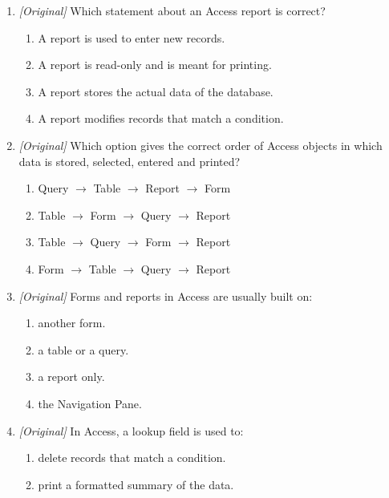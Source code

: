 \documentclass[11pt]{article}
\begin{document}
\begin{enumerate}[label=\textbf{Q\arabic*.}, leftmargin=*]
  formatted, printable layout?
  \begin{enumerate}[label=\Alph*.]
    \item Form
    \item Report
    \item Query
    \item Table
  \end{enumerate}
\item \textit{[Original]} Which statement about an Access report is correct?
  \begin{enumerate}[label=\Alph*.]
    \item A report is used to enter new records.
    \item A report is read-only and is meant for printing.
    \item A report stores the actual data of the database.
    \item A report modifies records that match a condition.
  \end{enumerate}
\item \textit{[Original]} Which option gives the correct order of Access
  objects in which data is stored, selected, entered and printed?
  \begin{enumerate}[label=\Alph*.]
    \item Query $\rightarrow$ Table $\rightarrow$ Report $\rightarrow$ Form
    \item Table $\rightarrow$ Form $\rightarrow$ Query $\rightarrow$ Report
    \item Table $\rightarrow$ Query $\rightarrow$ Form $\rightarrow$ Report
    \item Form $\rightarrow$ Table $\rightarrow$ Query $\rightarrow$ Report
  \end{enumerate}
\item \textit{[Original]} Forms and reports in Access are usually built on:
  \begin{enumerate}[label=\Alph*.]
    \item another form.
    \item a table or a query.
    \item a report only.
    \item the Navigation Pane.
  \end{enumerate}
\item \textit{[Original]} In Access, a lookup field is used to:
  \begin{enumerate}[label=\Alph*.]
    \item delete records that match a condition.
    \item print a formatted summary of the data.

\end{enumerate}
\end{enumerate}
\end{document}
